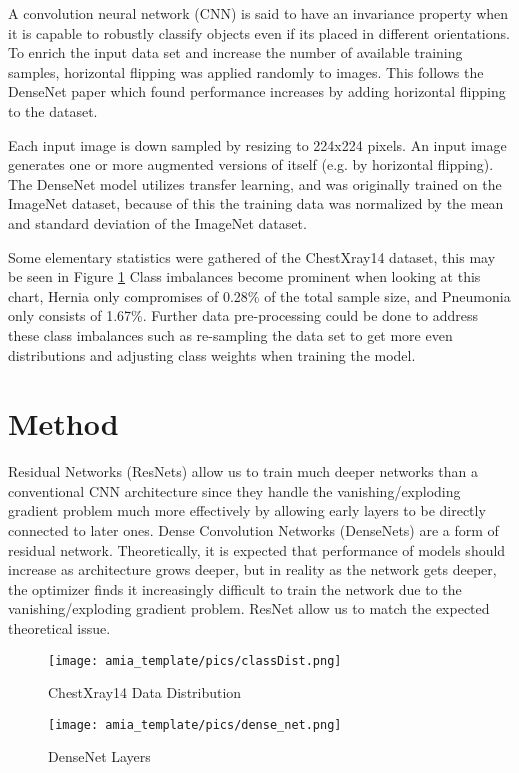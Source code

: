 \documentclass{amia}
\begin{document}
A convolution neural network (CNN) is said to have an invariance property when it is capable to robustly classify objects even if its placed in different orientations. To enrich the input data set and increase the number of available training samples, horizontal flipping was applied randomly to images. This follows the DenseNet paper which found performance increases by adding horizontal flipping to the dataset.

Each input image is down sampled by resizing to 224x224 pixels. An input image generates one or more augmented versions of itself (e.g. by horizontal flipping). The DenseNet model utilizes transfer learning, and was originally trained on the ImageNet dataset, because of this the training data was normalized by the mean and standard deviation of the ImageNet dataset.

Some elementary statistics were gathered of the ChestXray14 dataset, this may be seen in Figure \ref{figd} Class imbalances become prominent when looking at this chart, Hernia only compromises of 0.28\% of the total sample size, and Pneumonia only consists of 1.67\%. Further data pre-processing could be done to address these class imbalances such as re-sampling the data set to get more even distributions and adjusting class weights when training the model.

\section*{Method}
Residual Networks (ResNets) allow us to train much deeper networks than a conventional CNN architecture since they handle the vanishing/exploding gradient problem much more effectively by allowing early layers to be directly connected to later ones. Dense Convolution Networks (DenseNets) are a form of residual network. Theoretically, it is expected that performance of models should increase as architecture grows deeper, but in reality as the network gets deeper, the optimizer finds it increasingly difficult to train the network due to the vanishing/exploding gradient problem. ResNet allow us to match the expected theoretical issue.

\begin{figure}[h!]
\centering
\texttt{[image: amia\_template/pics/classDist.png]}
\caption{ChestXray14 Data Distribution}
\label{figd}
\end{figure}

\begin{figure}[h!]
\centering
\texttt{[image: amia\_template/pics/dense\_net.png]}
\caption{DenseNet Layers}
\label{figx}
\end{figure}
\end{document}
